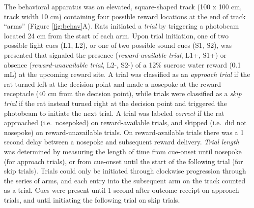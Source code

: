 \documentclass[11pt]{article}
\providecommand{\DIFadd}[1]{{\protect\color{red} \sf #1}} %
\providecommand{\DIFdel}[1]{} %
\providecommand{\DIFaddbegin}{} %
\providecommand{\DIFaddend}{} %
\providecommand{\DIFdelbegin}{} %
\providecommand{\DIFdelend}{} %
\newcommand{\DIFscaledelfig}{0.5}
\newlength{\DIFdelgraphicswidth} %
\newlength{\DIFdelgraphicsheight} %
\newcommand{\DIFaddincludegraphics}[2][]{{\color{red}\fbox{\DIFOincludegraphics[#1]{#2}}}} %
\newcommand{\DIFdelincludegraphics}[2][]{%
\sbox{\DIFdelgraphicsbox}{\DIFOincludegraphics[#1]{#2}}%
\settoboxwidth{\DIFdelgraphicswidth}{\DIFdelgraphicsbox} %
\settoboxtotalheight{\DIFdelgraphicsheight}{\DIFdelgraphicsbox} %
\scalebox{\DIFscaledelfig}{%
\parbox[b]{\DIFdelgraphicswidth}{\usebox{\DIFdelgraphicsbox}\\[-\baselineskip] \rule{\DIFdelgraphicswidth}{0em}}\llap{\resizebox{\DIFdelgraphicswidth}{\DIFdelgraphicsheight}{%
\setlength{\unitlength}{\DIFdelgraphicswidth}%
\begin{picture}(1,1)%
\thicklines\linethickness{2pt} %
{\color[rgb]{1,0,0}\put(0,0){\framebox(1,1){}}}%
{\color[rgb]{1,0,0}\put(0,0){\line( 1,1){1}}}%
{\color[rgb]{1,0,0}\put(0,1){\line(1,-1){1}}}%
\end{picture}%
}\hspace*{3pt}}} %
} %
\DeclareRobustCommand{\DIFaddbegin}{\DIFOaddbegin \let\includegraphics\DIFaddincludegraphics} %
\DeclareRobustCommand{\DIFaddend}{\DIFOaddend \let\includegraphics\DIFOincludegraphics} %
\DeclareRobustCommand{\DIFdelbegin}{\DIFOdelbegin \let\includegraphics\DIFdelincludegraphics} %
\DeclareRobustCommand{\DIFdelend}{\DIFOaddend \let\includegraphics\DIFOincludegraphics} %
\begin{document}
The behavioral apparatus was an elevated, square-shaped track (100 x
100 cm, track width 10 cm) containing four possible reward locations
at the end of track ``arms'' (Figure \DIFdelbegin \DIFdel{\ref{fig:task}}\DIFdelend \DIFaddbegin \DIFadd{\ref{fig:behav}A}\DIFaddend ). Rats initiated a
{\it trial} by triggering a photobeam located 24 cm from the start of
each arm. Upon trial initiation, one of two possible light cues (L1,
L2), or one of two possible sound cues (S1, S2), was presented that
signaled the presence ({\it reward-available trial}, L1+, S1+) or
absence ({\it reward-unavailable trial}, L2-, S2-) of a 12\% sucrose
water reward (0.1 mL) at the upcoming reward site. A trial was
classified as an {\it approach trial} if the rat turned left at the
decision point and made a nosepoke at the reward receptacle (40 cm
from the decision point), while trials were classified as a {\it skip
trial} if the rat instead turned right at the decision point and
triggered the photobeam to initiate the next trial. A trial \DIFdelbegin \DIFdel{is }\DIFdelend \DIFaddbegin \DIFadd{was }\DIFaddend labeled
{\it correct} if the rat approached (i.e.\ nosepoked) on
reward-available trials, and skipped (i.e.\ did not nosepoke) on
reward-unavailable trials. On reward-available trials there was a 1
second delay between a nosepoke and subsequent reward delivery. {\it
Trial length} was determined by measuring the length of time from
\DIFdelbegin \DIFdel{cue onset }\DIFdelend \DIFaddbegin \DIFadd{cue-onset }\DIFaddend until nosepoke (for approach trials), or from \DIFdelbegin \DIFdel{cue onset
}\DIFdelend \DIFaddbegin \DIFadd{cue-onset
}\DIFaddend until the start of the following trial (for skip trials). Trials could
only be initiated through clockwise progression through the series of
arms, and each entry into the subsequent arm on the track counted as a
trial. \DIFaddbegin \DIFadd{Cues were present until 1  second after outcome receipt on approach trials, and until initiating the following trial on skip trials.
}\DIFaddend 
\end{document}
